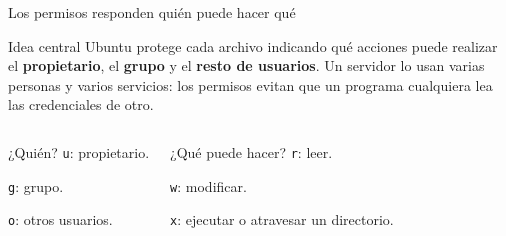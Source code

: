 \documentclass[aspectratio=169,10pt,c]{beamer}
\begin{document}
\begin{frame}{Los permisos responden quién puede hacer qué}
\begin{block}{Idea central}
\small Ubuntu protege cada archivo indicando qué acciones puede realizar el \textbf{propietario}, el \textbf{grupo} y el \textbf{resto de usuarios}. Un servidor lo usan varias personas y varios servicios: los permisos evitan que un programa cualquiera lea las credenciales de otro.
\end{block}
\begin{columns}[T,onlytextwidth]
\begin{exampleblock}{¿Quién?}
\small
\texttt{u}: propietario.\par\medskip
\texttt{g}: grupo.\par\medskip
\texttt{o}: otros usuarios.
\end{exampleblock}
\begin{exampleblock}{¿Qué puede hacer?}
\small
\texttt{r}: leer.\par\medskip
\texttt{w}: modificar.\par\medskip
\texttt{x}: ejecutar o atravesar un directorio.
\end{exampleblock}
\end{columns}
\end{frame}
\end{document}
